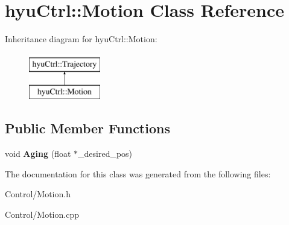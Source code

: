 \hypertarget{classhyu_ctrl_1_1_motion}{}\section{hyu\+Ctrl\+:\+:Motion Class Reference}
\label{classhyu_ctrl_1_1_motion}
Inheritance diagram for hyu\+Ctrl\+:\+:Motion\+:\begin{figure}[H]
\begin{center}
\leavevmode
\includegraphics[height=2.000000cm]{classhyu_ctrl_1_1_motion}
\end{center}
\end{figure}
\subsection*{Public Member Functions}
\begin{DoxyCompactItemize}
\item 
\mbox{\label{classhyu_ctrl_1_1_motion_a52057bdbff9f469f01d1fd0ce1445c80}} 
void {\bfseries Aging} (float $\ast$\+\_\+desired\+\_\+pos)
\end{DoxyCompactItemize}


The documentation for this class was generated from the following files\+:\begin{DoxyCompactItemize}
\item 
Control/Motion.\+h\item 
Control/Motion.\+cpp\end{DoxyCompactItemize}
